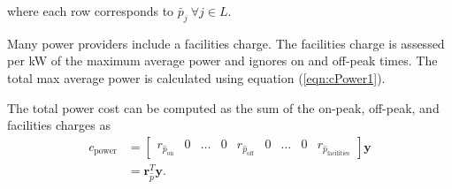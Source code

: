 where each row corresponds to $\bar{p}_j \ \forall j \in L$.
\par Many power providers include a facilities charge.  The facilities
charge is assessed per kW of the maximum average power and ignores on
and off-peak times. The total max average power is calculated using equation (\ref{eqn:cPower1}).
\par The total power cost can be computed as the sum of the on-peak, off-peak, and facilities charges as 
\begin{equation}
	\begin{aligned}
		c_\text{power} &= \begin{bmatrix}r_{\hat{p}_{\text{on}}}&0 & \hdots & 0 & r_{\hat{p}_{\text{off}}} & 0& \hdots &0& r_{\hat{p}_{\text{facilities}}} \end{bmatrix}\mathbf{y} \\
			&= \mathbf{r}_{\hat{p}}^T\mathbf{y}.
	\end{aligned}
\end{equation}

